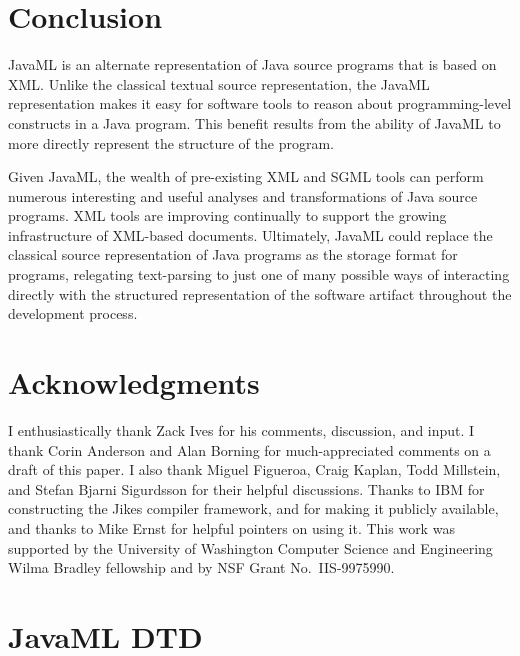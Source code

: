 \documentclass{article}
\begin{document}
\begin{multicols}{2}
\section{Conclusion}
\label{sec-conclusion}

JavaML is an alternate representation of Java source programs that is
based on XML.  Unlike the classical textual source representation, the
JavaML representation makes it easy for software tools to reason about
programming-level constructs in a Java program.  This benefit results from the
ability of JavaML to more directly represent the structure of the program.

Given JavaML, the wealth of pre-existing XML and SGML tools can perform
numerous interesting and useful analyses and transformations of Java
source programs.  XML tools are improving continually to support the
growing infrastructure of XML-based documents.  Ultimately, JavaML could
replace the classical source representation of Java programs as the
storage format for programs, relegating text-parsing to just one of many
possible ways of interacting directly with the structured representation
of the software artifact throughout the development process.

\section*{Acknowledgments}
\label{sec-ack}

I enthusiastically thank Zack Ives for his comments, discussion, and
input.  I thank Corin Anderson and Alan Borning for much-appreciated
comments on a draft of this paper.  I also thank Miguel Figueroa, Craig
Kaplan, Todd Millstein, and Stefan Bjarni Sigurdsson for their
helpful discussions. Thanks to IBM for constructing the Jikes compiler
framework, and for making it publicly available, and thanks to Mike
Ernst for helpful pointers on using it. This work was supported by the
University of Washington Computer Science and Engineering Wilma Bradley
fellowship and by NSF Grant No.~IIS-9975990.

\appendix
\section{JavaML DTD}
\label{app-javaml-dtd}

{\small

}




\end{multicols}
\end{document}
